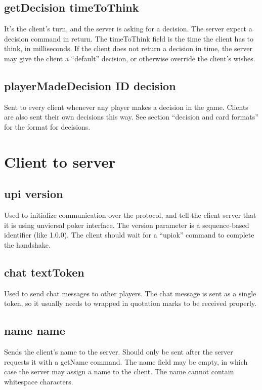 \documentclass{article}
\begin{document}
\subsection*{getDecision \textlangle{}timeToThink\textrangle{}}
It's the client's turn, and the server is asking for a decision. The server expect a decision command in return. The timeToThink field is the time the client has to think, in milliseconds. If the client does not return a decision in time, the server may give the client a ``default'' decision, or otherwise override the client's wishes.

\subsection*{playerMadeDecision \textlangle{}ID\textrangle{} \textlangle{}decision\textrangle{}}
Sent to every client whenever any player makes a decision in the game. Clients are also sent their own decisions this way. See section ``decision and card formats'' for the format for decisions.

\section{Client to server}

\subsection*{upi \textlangle{}version\textrangle{}}
Used to initialize communication over the protocol, and tell the client server that it is using unviersal poker interface. The version parameter is a sequence-based identifier (like 1.0.0). The client should wait for a ``upiok'' command to complete the handshake.

\subsection*{chat textToken}
Used to send chat messages to other players. The chat message is sent as a single token, so it usually needs to wrapped in quotation marks to be received properly.

\subsection*{name \textlangle{}name\textrangle{}}
Sends the client's name to the server. Should only be sent after the server requests it with a getName command. The name field may be empty, in which case the server may assign a name to the client. The name cannot contain whitespace characters.
\end{document}
